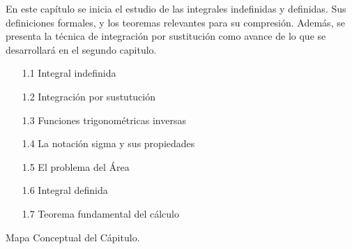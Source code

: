 \begin{center}
\begin{tcolorbox}[enhanced,colback=blue!5!white, colframe=blue!5!white, title=Resumen,coltitle=black, attach boxed title to top left=
{yshift=-\tcboxedtitleheight/2},
boxed title style={size=small,colback=blue!50!white}]
En este cap\'itulo se inicia el estudio de las integrales indefinidas y definidas. Sus definiciones formales, y los teoremas relevantes para su compresi\'on. Adem\'as, se presenta la t\'ecnica de integraci\'on por sustituci\'on como avance de lo que se desarrollar\'a en el segundo capitulo. 
\end{tcolorbox}
\end{center}
\begin{tcolorbox}[enhanced,colback=blue!5!white, colframe=blue!5!white,title=Subtemas,coltitle=black, attach boxed title to top right=
{yshift=-\tcboxedtitleheight/2},
boxed title style={colback=blue!50!white}]%
\begin{enumerate}
\item[1.1] Integral indefinida
\item[1.2] Integraci\'on por sustutuci\'on 
\item[1.3] Funciones trigonom\'etricas inversas
\item[1.4] La notaci\'on sigma y sus propiedades 
\item[1.5] El problema del \'Area  
\item[1.6] Integral definida
\item[1.7] Teorema  fundamental del c\'alculo
\end{enumerate}
\end{tcolorbox}
\newpage
\thispagestyle{empty}

 \hfill \Large \textcolor{red!50!black}{Mapa Conceptual del Cápitulo.}\hfill\vspace{20pt}
 
